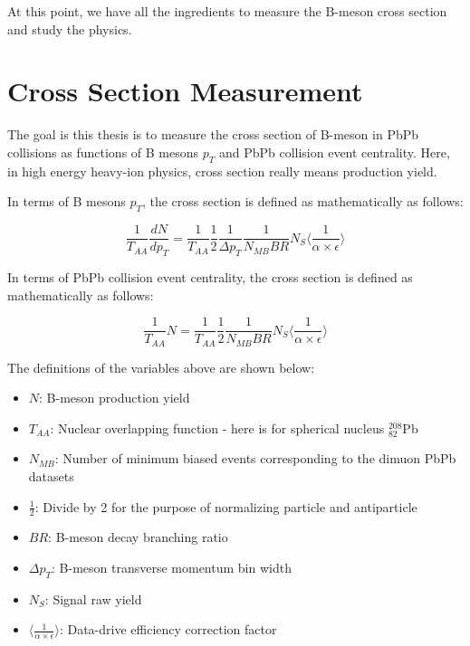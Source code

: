At this point, we have all the ingredients to measure the B-meson cross section and study the physics. 

\section{Cross Section Measurement} 

The goal is this thesis is to measure the cross section of B-meson in PbPb collisions as functions of B mesons $p_T$ and PbPb collision event centrality. Here, in high energy heavy-ion physics, cross section really means production yield. 

In terms of B mesons $p_T$, the cross section is defined as mathematically as follows:

\begin{equation}
\frac{1}{T_{AA}}\frac{dN}{d p_T} =  \frac{1}{T_{AA}} \frac{1}{2} \frac{1}{\Delta p_T} \frac{1}{N_{MB} BR } N_S \langle\frac{1}{\alpha \times \epsilon} \rangle
\end{equation}

In terms of PbPb collision event centrality, the cross section is defined as mathematically as follows:

\begin{equation}
\frac{1}{T_{AA}} N =  \frac{1}{T_{AA}} \frac{1}{2} \frac{1}{N_{MB} BR} N_S \langle\frac{1}{\alpha \times \epsilon} \rangle
\end{equation}

The definitions of the variables above are shown below:

\begin{itemize}
\item $N$: B-meson production yield
\item $T_{AA}$: Nuclear overlapping function - here is for spherical nucleus ${}^{208}_{82}$Pb  
\item $N_{MB}$: Number of minimum biased events corresponding to the dimuon PbPb datasets
\item $\frac{1}{2}$: Divide by 2 for the purpose of normalizing particle and antiparticle 
\item $BR$: B-meson decay branching ratio
\item $\Delta p_T$: B-meson transverse momentum bin width
\item $N_S$: Signal raw yield 
\item $\langle\frac{1}{\alpha \times \epsilon} \rangle$: Data-drive efficiency correction factor
\end{itemize}

